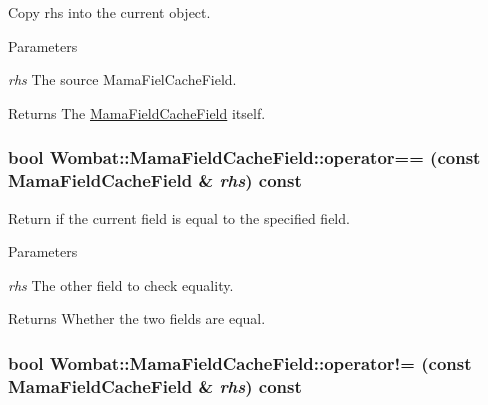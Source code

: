 Copy rhs into the current object. 
\begin{DoxyParams}{Parameters}
\item[{\em rhs}]The source MamaFielCacheField. \end{DoxyParams}
\begin{DoxyReturn}{Returns}
The \hyperlink{classWombat_1_1MamaFieldCacheField}{MamaFieldCacheField} itself. 
\end{DoxyReturn}
\hypertarget{classWombat_1_1MamaFieldCacheField_a5cbfcf9063b0c4338c29601ef58d5e5d}{
\subsubsection[{operator==}]{\setlength{\rightskip}{0pt plus 5cm}bool Wombat::MamaFieldCacheField::operator== (const {\bf MamaFieldCacheField} \& {\em rhs}) const}}
\label{classWombat_1_1MamaFieldCacheField_a5cbfcf9063b0c4338c29601ef58d5e5d}


Return if the current field is equal to the specified field. 
\begin{DoxyParams}{Parameters}
\item[{\em rhs}]The other field to check equality. \end{DoxyParams}
\begin{DoxyReturn}{Returns}
Whether the two fields are equal. 
\end{DoxyReturn}
\hypertarget{classWombat_1_1MamaFieldCacheField_a07b2c870f5a5e2c1e12567d9dafda9a2}{
\subsubsection[{operator!=}]{\setlength{\rightskip}{0pt plus 5cm}bool Wombat::MamaFieldCacheField::operator!= (const {\bf MamaFieldCacheField} \& {\em rhs}) const}}
\label{classWombat_1_1MamaFieldCacheField_a07b2c870f5a5e2c1e12567d9dafda9a2}


